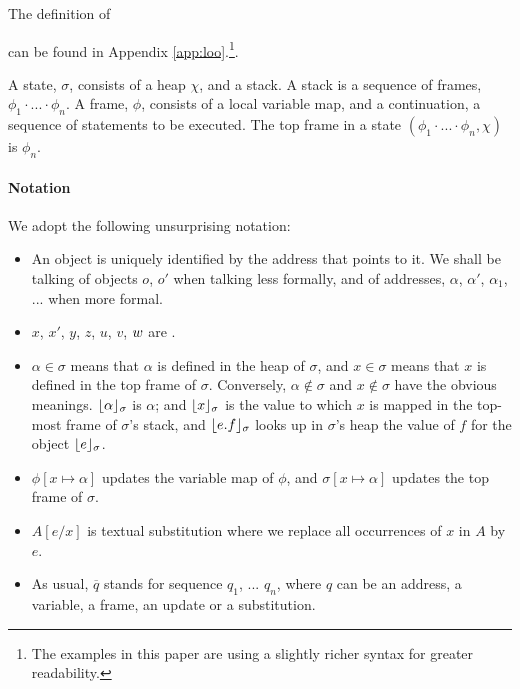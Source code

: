  The definition of \LangOO~ {can be found in   {Appendix \ref{app:loo}.}\footnote{{{The examples in this paper are using  a slightly richer syntax for greater readability.}}}.
 
A \LangOO state, $\sigma$,  consists of a  heap $\chi$, and a   stack. 
{A stack  is a sequence of frames, $\phi_1\!\cdot\!...\!\cdot\! \phi_n$.}
A  frame, $\phi$, consists of a local variable map, and a continuation, \ie a sequence of statements to be executed.
The top frame in a state $(\phi_1\!\cdot\!...\!\cdot\! \phi_n, \chi)$ is $\phi_n$. 


 
\paragraph{Notation} We adopt the following unsurprising notation:
\label{s:notation}
\begin{itemize}
\item
{An object is uniquely identified by the address that points to it. We shall be talking of objects $o$, $o'$ when talking less formally, and of addresses, $\alpha$, $\alpha'$, $\alpha_1$, ...  when more formal.}
\item
$x$, $x'$, $y$, $z$, $u$, $v$, $w$  are . 
\item
$\alpha \in \sigma$ means that $\alpha$ is defined in the heap of $\sigma$, and $x\in \sigma$ means that $x$ is defined in the top frame of $\sigma$.
Conversely,  $\alpha\notin\sigma$ and $x\notin\sigma$ %
 have the obvious meanings.
$\lfloor \alpha \rfloor_{\sigma}$  is $\alpha$; and $\lfloor x \rfloor_{\sigma}$  is the value to which  $x$  is mapped in the top-most frame of $\sigma$'s stack, 
and $\lfloor e.f \rfloor_{\sigma}$ looks up in $\sigma$'s heap the value of $f$ for the object  $\lfloor e \rfloor_{\sigma}$.
\item %
$\phi[x \mapsto \alpha]$ updates  the variable map  of $\phi$,  
and  $\sigma[x \mapsto \alpha]$ updates the top frame of $\sigma$.
\item
$A[e/x]$ is textual substitution where we replace all occurrences of $x$ in $A$ by $e.$ 
\item
As usual, $\overline q$ stands for  sequence $q_1$, ... $q_n$, where $q$ can be an address, a variable,    a frame, an update or a substitution.

\end{itemize}}

